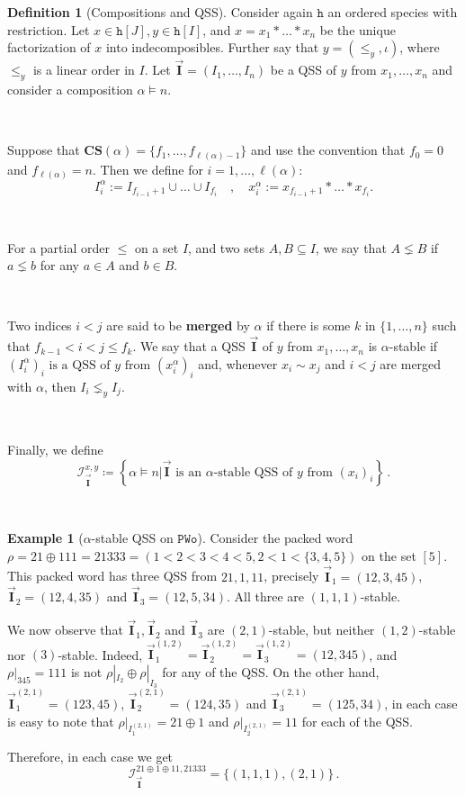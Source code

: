 \documentclass[12pt, reqno]{amsart}
\theoremstyle{definition}
\newtheorem{defin}[thm]{Definition}
\newtheorem{smpl}[thm]{Example}
\newcommand{\III}{\vec{\mathbf{I}}}
\begin{document}
\begin{defin}[Compositions and QSS]
Consider again $\mathtt{h}$ an ordered species with restriction.
Let $x \in \mathtt{h}[J], y \in  \mathtt{h}[I]$, and $x = x_1\ast \dots \ast x_n$ be the unique factorization of $x$ into indecomposibles.
Further say that $y = (\leq_y, \iota)$, where $\leq_y$ is a linear order in $I$.
Let $\III = (I_1, \dots , I_n)$ be a QSS of $y$ from $x_1, \dots, x_n$ and consider a composition $\alpha \models n$.

\

Suppose that $ \mathbf{CS} (\alpha) = \{f_1, \dots, f_{\ell(\alpha) - 1} \}$ and use the convention that $f_0 = 0$ and $f_{\ell(\alpha)} = n$. 
Then we define for $i = 1, \dots, \ell(\alpha)$:
\[I^{\alpha}_i := I_{f_{i-1} + 1} \cup \dots \cup I_{f_i} \quad , \quad x^{\alpha}_i := x_{f_{i-1} + 1} \ast \dots \ast x_{f_i}.\]

\

For a partial order $\leq$ on a set $I$, and two sets $A, B \subseteq I$, we say that $A \lneq B$ if $a \lneq b$ for any $a \in A$ and $b \in B$.

\

Two indices $i< j$ are said to be \textbf{merged} by $\alpha$ if there is some $k$ in $\{1, \dots, n\}$ such that $ f_{k-1} < i < j \leq f_k$.
We say that a QSS $\III$ of $y$ from $x_1, \dots , x_n$ is $\alpha $-stable if $(I^{\alpha}_i)_i \text{ is a QSS of $y$ from } (x^{\alpha}_i)_i$ and, whenever $x_i \sim x_j$ and $i < j$ are merged with $\alpha $, then $I_i \lneq_y I_j$.

\

Finally, we define 
$$\mathcal I^{x, y}_{\III} \coloneqq \left\{ \alpha \models n \Big| \III \text{ is an $\alpha$-stable QSS of $y$ from } (x_i)_i \right\} \, .$$

\end{defin}

\

\begin{smpl}[$\alpha$-stable QSS on $\mathtt{PWo}$]
Consider the packed word $\rho = 21 \oplus 111 = 21333 = (1 < 2 < 3 < 4 < 5, 2 < 1 < \{3, 4, 5\})$ on the set $[5]$.
This packed word has three QSS from $21, 1, 11$, precisely $\III_1 =(12, 3, 45)$, $\III_2 =(12, 4, 35)$ and $\III_3 =(12, 5, 34)$.
All three are $(1, 1, 1)$-stable.

We now observe that $\III_1, \III_2$ and $\III_3$ are $(2, 1)$-stable, but neither $(1, 2)$-stable nor $(3)$-stable.
Indeed, $\III_1^{(1, 2)} = \III_2^{(1, 2)} = \III_3^{(1, 2)} = (12, 345)$, and $\rho|_{345} = 111$ is not $\rho|_{I_2} \oplus \rho|_{I_3}$ for any of the QSS.
On the other hand, $\III_1^{(2, 1)} = (123, 45)$, $\III_2^{(2, 1)} = (124, 35)$ and $\III_3^{(2, 1)} = (125, 34)$, in each case is easy to note that $\rho|_{I_1^{(2, 1)}} = 21\oplus 1$ and $\rho|_{I_2^{(2, 1)}} = 11$ for each of the QSS.

Therefore, in each case we get
$$\mathcal I_{\III}^{21\oplus 1\oplus 11, 21333} = \{(1, 1, 1), (2, 1)\}\, . $$
\end{smpl}
\end{document}
